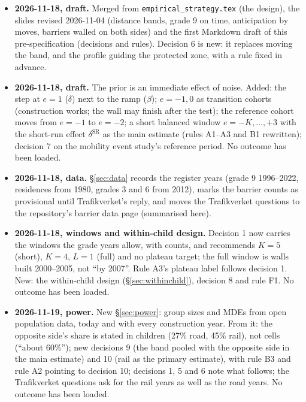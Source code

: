 \documentclass[11pt]{article}
\begin{document}
\begin{itemize}
\item \textbf{2026-11-18, draft.} Merged from \texttt{empirical\_strategy.tex} (the design), the
  slides revised 2026-11-04 (distance bands, grade 9 on time, anticipation by moves, barriers
  walled on both sides) and the first Markdown draft of this pre-specification (decisions and
  rules). Decision 6 is new: it replaces moving the band, and the profile guiding the protected
  zone, with a rule fixed in advance.
\item \textbf{2026-11-18, draft.} The prior is an immediate effect of noise. Added: the step at
  \(e = 1\) (\(\delta\)) next to the ramp (\(\beta\)); \(e = -1, 0\) as transition cohorts
  (construction works; the wall may finish after the test); the reference cohort moves from
  \(e = -1\) to \(e = -2\); a short balanced window \(e = -K, \dots, +3\) with the short-run effect
  \(\delta^{\text{SR}}\) as the main estimate (rules A1--A3 and B1 rewritten); decision 7 on the
  mobility event study's reference period. No outcome has been loaded.
\item \textbf{2026-11-18, data.} \S\ref{sec:data} records the register years (grade 9
  1996--2022, residences from 1980, grades 3 and 6 from 2012), marks the barrier counts as
  provisional until Trafikverket's reply, and moves the Trafikverket questions to the
  repository's barrier data page (summarised here).
\item \textbf{2026-11-18, windows and within-child design.} Decision 1 now carries the windows the
  grade years allow, with counts, and recommends \(K = 5\) (short), \(K = 4\), \(L = 1\) (full)
  and no plateau target; the full window is walls built 2000--2005, not ``by 2007''. Rule A3's
  plateau label follows decision 1. New: the within-child design (\S\ref{sec:withinchild}),
  decision 8 and rule F1. No outcome has been loaded.
\item \textbf{2026-11-19, power.} New \S\ref{sec:power}: group sizes and MDEs from open
  population data, today and with every construction year. From it: the opposite side's share
  is stated in children (27\% road, 45\% rail), not cells (``about 60\%''); new decisions 9
  (the band pooled with the opposite side in the main estimate) and 10 (rail as the primary
  estimate), with rule B3 and rule A2 pointing to decision 10; decisions 1, 5 and 6 note what
  follows; the Trafikverket questions ask for the rail years as well as the road years. No
  outcome has been loaded.
\end{itemize}

\printbibliography[title={References}]
\end{document}
